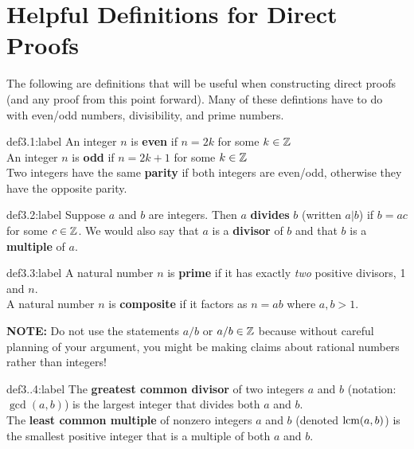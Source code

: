 \section{Helpful Definitions for Direct Proofs}

The following are definitions that will be useful when constructing direct proofs (and any proof from this point forward). Many of these defintions have to do with even/odd numbers, divisibility, and prime numbers.

\begin{definition}{def3.1:label}
    An integer $n$ is \textbf{even} if $n=2k$ for some $k \in \mathbb{Z}$\\

    An integer $n$ is \textbf{odd} if $n=2k+1$ for some $k \in \mathbb{Z}$\\

    Two integers have the same \textbf{parity} if both integers are even/odd, otherwise they have the opposite parity.
\end{definition}

\begin{definition}{def3.2:label}
    Suppose $a$ and $b$ are integers. Then $a$ \textbf{divides} $b$ (written $a|b$) if $b = ac$ for some $c\in \mathbb{Z}$. We would also say that $a$ is a \textbf{divisor} of $b$ and that $b$ is a \textbf{multiple} of $a$. 
\end{definition}

\begin{definition}{def3.3:label}
    A natural number $n$ is \textbf{prime} if it has exactly \textit{two} positive divisors, 1 and $n$.\\

    A natural number $n$ is \textbf{composite} if it factors as $n=ab$ where $a,b>1$.
\end{definition}

\textbf{NOTE:} Do not use the statements $a/b$ or $a/b \in \mathbb{Z}$ because without careful planning of your argument, you might be making claims about rational numbers rather than integers!
\newpage

\begin{definition}{def3..4:label}
    The \textbf{greatest common divisor} of two integers $a$ and $b$ (notation: $\gcd(a,b)$) is the largest integer that divides both $a$ and $b$. \\

    The \textbf{least common multiple} of nonzero integers $a$ and $b$ (denoted $\text{lcm}(a,b)$) is the smallest positive integer that is a multiple of both $a$ and $b$.
\end{definition}


